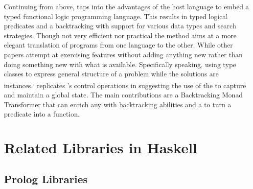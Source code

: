 \documentclass[thesis-solanki.tex]{subfiles}
\begin{document}
Continuing from above, \cite{claessen2000typed} taps into the advantages of the host language to embed a typed
functional logic programming language.
This results in typed logical predicates and a backtracking  with support for various data
types and search strategies.
Though not very efficient nor practical the method aims at a more elegant translation of programs from one language
to the other.
While other papers \cite{erwig2004escape} attempt at exercising  features without adding
anything new rather than doing something new with what is available.
Specifically speaking, using  type classes to express general structure of a problem while the
solutions are instances.\textsuperscript{,}
\cite{hinze1998prological} replicates 's control operations in  suggesting the
use of the   to capture and maintain a global state.
The main contributions are a Backtracking Monad Transformer that can enrich any  with
backtracking abilities and a  to turn a  predicate into a
 function.



\section{Related Libraries in Haskell}
\subsection{Prolog Libraries}
\end{document}
